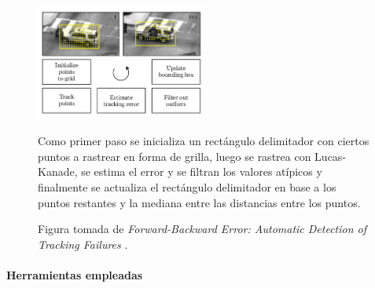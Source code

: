 \documentclass[a4paper,openright,12pt]{report}
\begin{document}
\begin{figure}[H]
  \centering
    \includegraphics[width=0.5\textwidth]{../images/medianflow.png}\par
  \caption{Como primer paso se inicializa un rectángulo
        delimitador con ciertos puntos a rastrear en forma de grilla, luego
        se rastrea con Lucas-Kanade, se estima el error y se filtran los
        valores atípicos y finalmente se actualiza el rectángulo delimitador
        en base a los puntos restantes y la mediana entre las distancias entre
        los puntos.}
    \label{fig:median-flow}
  \caption*{Figura tomada de
    \textit{Forward-Backward Error: Automatic Detection of Tracking Failures}
        \cite{kalal2010forward}.}
\end{figure}

\paragraph{Herramientas empleadas}\mbox{} \\
\end{document}
